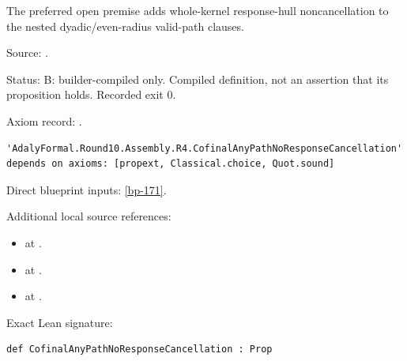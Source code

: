 \begin{definition}[bp-176]
\label{bp-176}
\leanok
The preferred open premise adds whole-kernel response-hull noncancellation to the nested dyadic/even-radius valid-path clauses.

\par Source: \texttt{}.
\par Status: B: builder-compiled only. Compiled definition, not an assertion that its proposition holds. Recorded exit 0.
\par Axiom record: \texttt{}.
\begin{verbatim}
'AdalyFormal.Round10.Assembly.R4.CofinalAnyPathNoResponseCancellation' depends on axioms: [propext, Classical.choice, Quot.sound]
\end{verbatim}
\par Direct blueprint inputs: \ref{bp-171}.
\par Additional local source references:
\begin{itemize}
\item \texttt{} at \texttt{}.
\item \texttt{} at \texttt{}.
\item \texttt{} at \texttt{}.
\end{itemize}
\par Exact Lean signature:
\begin{verbatim}
def CofinalAnyPathNoResponseCancellation : Prop
\end{verbatim}
\end{definition}

